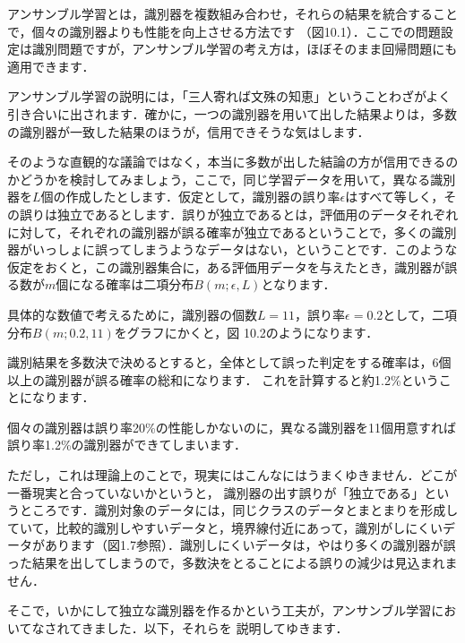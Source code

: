 

アンサンブル学習とは，識別器を複数組み合わせ，それらの結果を統合することで，個々の識別器よりも性能を向上させる方法です
（図10.1）．ここでの問題設定は識別問題ですが，アンサンブル学習の考え方は，ほぼそのまま回帰問題にも適用できます．


アンサンブル学習の説明には，「三人寄れば文殊の知恵」ということわざがよく引き合いに出されます．確かに，一つの識別器を用いて出した結果よりは，多数の識別器が一致した結果のほうが，信用できそうな気はします．

そのような直観的な議論ではなく，本当に多数が出した結論の方が信用できるのかどうかを検討してみましょう，ここで，同じ学習データを用いて，異なる識別器を$L$個の作成したとします．仮定として，識別器の誤り率$\epsilon$はすべて等しく，その誤りは独立であるとします．誤りが独立であるとは，評価用のデータそれぞれに対して，それぞれの識別器が誤る確率が独立であるということで，多くの識別器がいっしょに誤ってしまうようなデータはない，ということです．このような仮定をおくと，この識別器集合に，ある評価用データを与えたとき，識別器が誤る数が$m$個になる確率は二項分布$B(m; \epsilon, L)$となります．



具体的な数値で考えるために，識別器の個数$L=11$，誤り率$\epsilon=0.2$として，二項分布$B(m; 0.2, 11)$をグラフにかくと，図
10.2のようになります．


識別結果を多数決で決めるとすると，全体として誤った判定をする確率は，6個以上の識別器が誤る確率の総和になります．
これを計算すると約1.2\%ということになります．

個々の識別器は誤り率20\%の性能しかないのに，異なる識別器を11個用意すれば誤り率1.2\%の識別器ができてしまいます．


ただし，これは理論上のことで，現実にはこんなにはうまくゆきません．どこが一番現実と合っていないかというと，
識別器の出す誤りが「独立である」というところです．識別対象のデータには，同じクラスのデータとまとまりを形成していて，比較的識別しやすいデータと，境界線付近にあって，識別がしにくいデータがあります（図1.7参照）．識別しにくいデータは，やはり多くの識別器が誤った結果を出してしまうので，多数決をとることによる誤りの減少は見込まれません．

そこで，いかにして独立な識別器を作るかという工夫が，アンサンブル学習においてなされてきました．以下，それらを
説明してゆきます．

